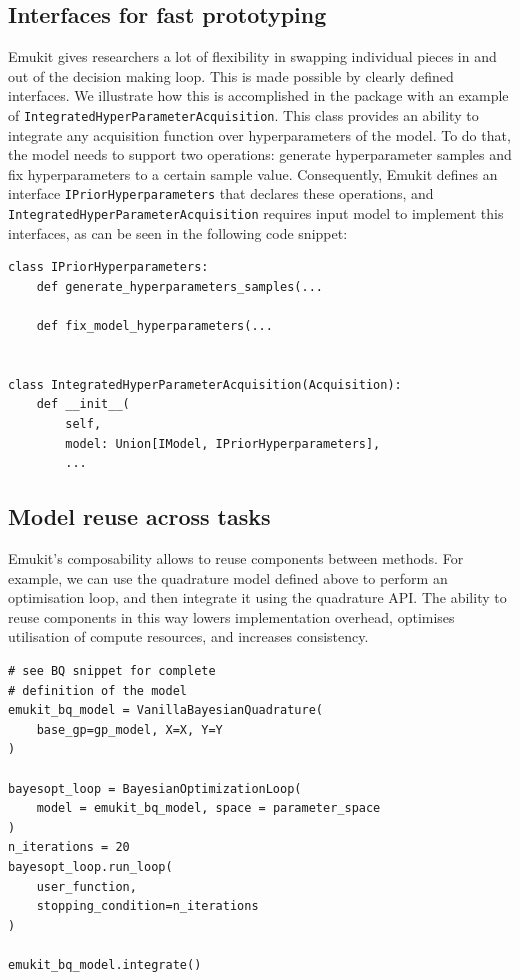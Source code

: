 \subsection{Interfaces for fast prototyping}
Emukit gives researchers a lot of flexibility in swapping individual pieces in and out of the decision making loop. This is made possible by clearly defined interfaces. We illustrate how this is accomplished in the package with an example of \texttt{IntegratedHyperParameterAcquisition}. This class provides an ability to integrate any acquisition function over hyperparameters of the model. To do that, the model needs to support two operations: generate hyperparameter samples and fix hyperparameters to a certain sample value. Consequently, Emukit defines an interface \texttt{IPriorHyperparameters} that declares these operations, and \texttt{IntegratedHyperParameterAcquisition} requires input model to implement this interfaces, as can be seen in the following code snippet:

\begin{verbatim}
class IPriorHyperparameters:
    def generate_hyperparameters_samples(...

    def fix_model_hyperparameters(...


class IntegratedHyperParameterAcquisition(Acquisition):
    def __init__(
        self,
        model: Union[IModel, IPriorHyperparameters],
        ...
\end{verbatim}

\subsection{Model reuse across tasks}

Emukit's composability allows to reuse components between methods. For example, we can use the quadrature model defined above to perform an optimisation loop, and then integrate it using the quadrature API. The ability to reuse components in this way lowers implementation overhead, optimises utilisation of compute resources, and increases consistency.

\begin{verbatim}
# see BQ snippet for complete
# definition of the model
emukit_bq_model = VanillaBayesianQuadrature(
    base_gp=gp_model, X=X, Y=Y
)

bayesopt_loop = BayesianOptimizationLoop(
    model = emukit_bq_model, space = parameter_space
)
n_iterations = 20
bayesopt_loop.run_loop(
    user_function,
    stopping_condition=n_iterations
)

emukit_bq_model.integrate()
\end{verbatim}


